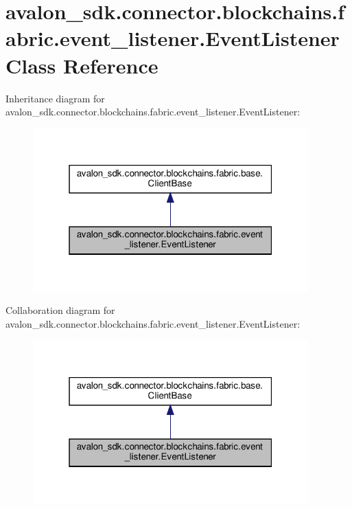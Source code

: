 \hypertarget{classavalon__sdk_1_1connector_1_1blockchains_1_1fabric_1_1event__listener_1_1EventListener}{}\section{avalon\+\_\+sdk.\+connector.\+blockchains.\+fabric.\+event\+\_\+listener.\+Event\+Listener Class Reference}
\label{classavalon__sdk_1_1connector_1_1blockchains_1_1fabric_1_1event__listener_1_1EventListener}


Inheritance diagram for avalon\+\_\+sdk.\+connector.\+blockchains.\+fabric.\+event\+\_\+listener.\+Event\+Listener\+:
\nopagebreak
\begin{figure}[H]
\begin{center}
\leavevmode
\includegraphics[width=301pt]{classavalon__sdk_1_1connector_1_1blockchains_1_1fabric_1_1event__listener_1_1EventListener__inherit__graph}
\end{center}
\end{figure}


Collaboration diagram for avalon\+\_\+sdk.\+connector.\+blockchains.\+fabric.\+event\+\_\+listener.\+Event\+Listener\+:
\nopagebreak
\begin{figure}[H]
\begin{center}
\leavevmode
\includegraphics[width=301pt]{classavalon__sdk_1_1connector_1_1blockchains_1_1fabric_1_1event__listener_1_1EventListener__coll__graph}
\end{center}
\end{figure}
